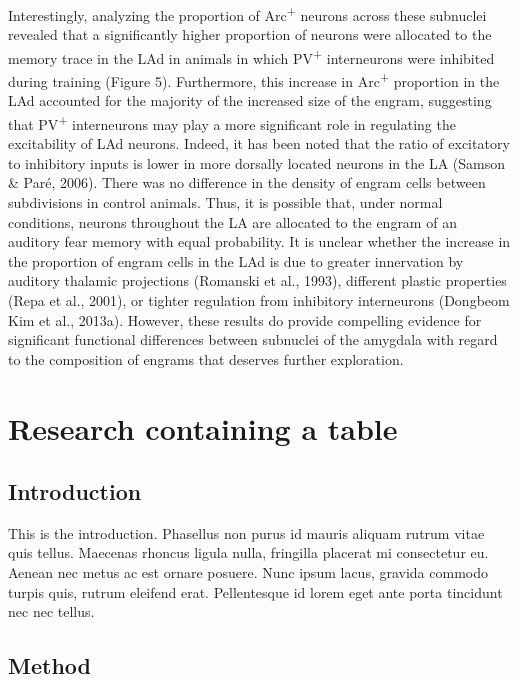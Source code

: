 \documentclass[12pt,a4paperpaper,]{report}
\begin{document}
Interestingly, analyzing the proportion of Arc\textsuperscript{+}
neurons across these subnuclei revealed that a significantly higher
proportion of neurons were allocated to the memory trace in the LAd in
animals in which PV\textsuperscript{+} interneurons were inhibited
during training (Figure 5). Furthermore, this increase in
Arc\textsuperscript{+} proportion in the LAd accounted for the majority
of the increased size of the engram, suggesting that
PV\textsuperscript{+} interneurons may play a more significant role in
regulating the excitability of LAd neurons. Indeed, it has been noted
that the ratio of excitatory to inhibitory inputs is lower in more
dorsally located neurons in the LA (Samson \& Paré, 2006). There was no
difference in the density of engram cells between subdivisions in
control animals. Thus, it is possible that, under normal conditions,
neurons throughout the LA are allocated to the engram of an auditory
fear memory with equal probability. It is unclear whether the increase
in the proportion of engram cells in the LAd is due to greater
innervation by auditory thalamic projections (Romanski et al., 1993),
different plastic properties (Repa et al., 2001), or tighter regulation
from inhibitory interneurons (Dongbeom Kim et al., 2013a). However,
these results do provide compelling evidence for significant functional
differences between subnuclei of the amygdala with regard to the
composition of engrams that deserves further exploration.

\chapter{Research containing a table}\label{research-containing-a-table}

\section{Introduction}\label{introduction-4}

This is the introduction. Phasellus non purus id mauris aliquam rutrum
vitae quis tellus. Maecenas rhoncus ligula nulla, fringilla placerat mi
consectetur eu. Aenean nec metus ac est ornare posuere. Nunc ipsum
lacus, gravida commodo turpis quis, rutrum eleifend erat. Pellentesque
id lorem eget ante porta tincidunt nec nec tellus.

\section{Method}\label{method-2}
\end{document}
